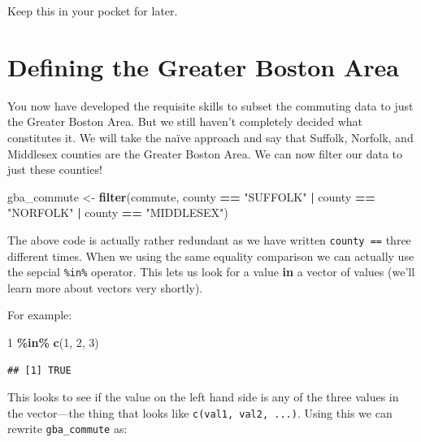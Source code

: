 \documentclass[
]{book}
\newenvironment{Shaded}{\begin{snugshade}}{\end{snugshade}}
\newcommand{\DecValTok}[1]{\textcolor[rgb]{0.00,0.00,0.81}{#1}}
\newcommand{\KeywordTok}[1]{\textcolor[rgb]{0.13,0.29,0.53}{\textbf{#1}}}
\newcommand{\NormalTok}[1]{#1}
\newcommand{\OperatorTok}[1]{\textcolor[rgb]{0.81,0.36,0.00}{\textbf{#1}}}
\newcommand{\StringTok}[1]{\textcolor[rgb]{0.31,0.60,0.02}{#1}}
\begin{document}
Keep this in your pocket for later.

\hypertarget{defining-the-greater-boston-area}{%
\section{Defining the Greater Boston Area}\label{defining-the-greater-boston-area}}

You now have developed the requisite skills to subset the commuting data to just the Greater Boston Area. But we still haven't completely decided what constitutes it. We will take the naïve approach and say that Suffolk, Norfolk, and Middlesex counties are the Greater Boston Area. We can now filter our data to just these counties!

\begin{Shaded}
\begin{Highlighting}[]
\NormalTok{gba\_commute \textless{}{-}}\StringTok{ }\KeywordTok{filter}\NormalTok{(commute, county }\OperatorTok{==}\StringTok{ "SUFFOLK"} \OperatorTok{|}\StringTok{ }\NormalTok{county }\OperatorTok{==}\StringTok{ "NORFOLK"} \OperatorTok{|}\StringTok{ }\NormalTok{county }\OperatorTok{==}\StringTok{ "MIDDLESEX"}\NormalTok{)}
\end{Highlighting}
\end{Shaded}

The above code is actually rather redundant as we have written \texttt{county\ ==} three different times. When we using the same equality comparison we can actually use the sepcial \texttt{\%in\%} operator. This lets us look for a value \textbf{in} a vector of values (we'll learn more about vectors very shortly).

For example:

\begin{Shaded}
\begin{Highlighting}[]
\DecValTok{1} \OperatorTok{\%in\%}\StringTok{ }\KeywordTok{c}\NormalTok{(}\DecValTok{1}\NormalTok{, }\DecValTok{2}\NormalTok{, }\DecValTok{3}\NormalTok{)}
\end{Highlighting}
\end{Shaded}

\begin{verbatim}
## [1] TRUE
\end{verbatim}

This looks to see if the value on the left hand side is any of the three values in the vector---the thing that looks like \texttt{c(val1,\ val2,\ ...)}. Using this we can rewrite \texttt{gba\_commute} as:
\end{document}
